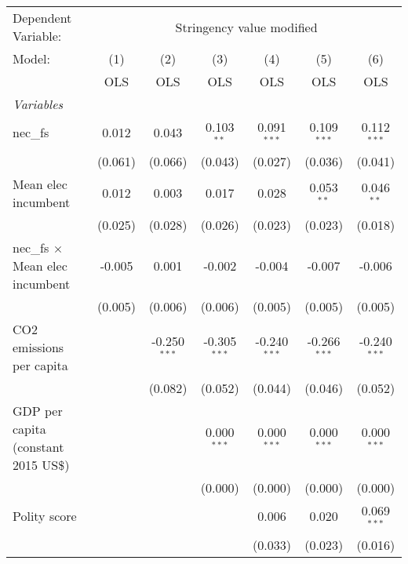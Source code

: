 
\begingroup
\centering
\begin{tabular}{lcccccc}
   \toprule
   Dependent Variable: & \multicolumn{6}{c}{Stringency value modified}\\
   Model:                                 & (1)     & (2)            & (3)            & (4)            & (5)            & (6)\\  
                                          &  OLS    & OLS            & OLS            & OLS            & OLS            & OLS\\  
   \midrule
   \emph{Variables}\\
   nec\_fs                                & 0.012   & 0.043          & 0.103$^{**}$   & 0.091$^{***}$  & 0.109$^{***}$  & 0.112$^{***}$\\   
                                          & (0.061) & (0.066)        & (0.043)        & (0.027)        & (0.036)        & (0.041)\\   
   Mean elec incumbent                    & 0.012   & 0.003          & 0.017          & 0.028          & 0.053$^{**}$   & 0.046$^{**}$\\   
                                          & (0.025) & (0.028)        & (0.026)        & (0.023)        & (0.023)        & (0.018)\\   
   nec\_fs $\times$ Mean elec incumbent   & -0.005  & 0.001          & -0.002         & -0.004         & -0.007         & -0.006\\   
                                          & (0.005) & (0.006)        & (0.006)        & (0.005)        & (0.005)        & (0.005)\\   
   CO2 emissions per capita               &         & -0.250$^{***}$ & -0.305$^{***}$ & -0.240$^{***}$ & -0.266$^{***}$ & -0.240$^{***}$\\   
                                          &         & (0.082)        & (0.052)        & (0.044)        & (0.046)        & (0.052)\\   
   GDP per capita (constant 2015 US\$)    &         &                & 0.000$^{***}$  & 0.000$^{***}$  & 0.000$^{***}$  & 0.000$^{***}$\\   
                                          &         &                & (0.000)        & (0.000)        & (0.000)        & (0.000)\\   
   Polity score                           &         &                &                & 0.006          & 0.020          & 0.069$^{***}$\\   
                                          &         &                &                & (0.033)        & (0.023)        & (0.016)\\   

\end{tabular}
